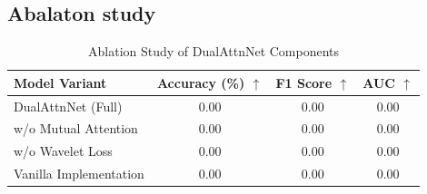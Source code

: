 \documentclass[12pt]{article}
\begin{document}
\subsection{Abalaton study}

\begin{table}[htbp]
    \caption{Ablation Study of DualAttnNet Components}
    \label{tab:ablation}
    \centering
    \begin{tabular}{lccc}
        \toprule
        \textbf{Model Variant} & \textbf{Accuracy (\%)} $\uparrow$ & \textbf{F1 Score} $\uparrow$ & \textbf{AUC} $\uparrow$        \\
        \midrule
        DualAttnNet (Full)     & 0.00                              & 0.00                         & 0.00                           \\
        \cmidrule{1-4}
        w/o Mutual Attention   & 0.00                              & 0.00                         & 0.00                           \\
        w/o Wavelet Loss       & 0.00                              & 0.00                         & 0.00                           \\
        Vanilla Implementation & 0.00                              & 0.00                         & 0.00                           \\
        \bottomrule
    \end{tabular}
    \vspace{2pt}

\end{table}
\end{document}
